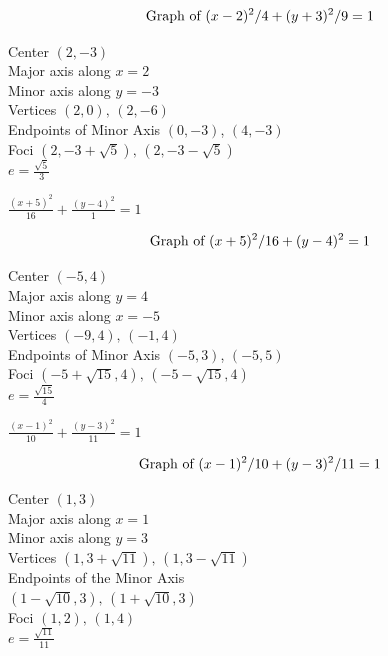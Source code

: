 \documentclass{ximera}
\begin{document}
\begin{question}
\begin{problem}
\begin{solution}
$$\text{Graph of $(x - 2)^2/4 + (y + 3)^2/9 = 1$}$$

Center $(2, -3)$\\
Major axis along $x = 2$\\
Minor axis along $y = -3$\\
Vertices $(2, 0), \, (2, -6)$\\
Endpoints of Minor Axis $(0,-3)$, $(4,-3)$\\
Foci $(2, -3 + \sqrt{5}), \, (2, -3 - \sqrt{5})$\\
$e = \frac{\sqrt{5}}{3}$\\
\end{solution}
\end{problem}

\begin{problem}
    $\frac{(x + 5)^{2}}{16} + \frac{(y - 4)^{2}}{1} = 1$

\begin{solution}
$$\text{Graph of $(x + 5)^2/16 + (y - 4)^2 = 1$}$$

Center $(-5, 4)$\\
Major axis along $y = 4$\\
Minor axis along $x = -5$\\
Vertices $(-9, 4), \, (-1, 4)$\\
Endpoints of Minor Axis $(-5,3)$, $(-5,5)$\\
Foci $(-5 + \sqrt{15}, 4), \, (-5 - \sqrt{15}, 4)$\\
$e = \frac{\sqrt{15}}{4}$\\
\end{solution}
\end{problem}

\begin{problem}\label{oddellipsefive}
    $\frac{(x - 1)^{2}}{10} + \frac{(y - 3)^{2}}{11} = 1$

\begin{solution}
$$\text{Graph of $(x - 1)^2/10 + (y - 3)^2/11 = 1$}$$

Center $(1, 3)$\\
Major axis along $x = 1$\\
Minor axis along $y = 3$\\
Vertices $(1, 3 + \sqrt{11}), \, (1, 3 - \sqrt{11})$\\
Endpoints of the Minor Axis \\ $(1-\sqrt{10}, 3), \, (1+\sqrt{10}, 3)$\\
Foci $(1, 2), \, (1, 4)$\\
$e = \frac{\sqrt{11}}{11}$\\
\end{solution}
\end{problem}


\end{question}
\end{document}
